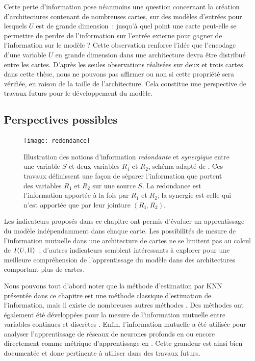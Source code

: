 \documentclass[../main]{subfiles}
\begin{document}
Cette perte d'information pose néanmoins une question concernant la création d'architectures contenant de nombreuses cartes, sur des modèles d'entrées pour lesquels $U$ est de grande dimension~: jusqu'à quel point une carte peut-elle se permettre de perdre de l'information sur l'entrée externe pour gagner de l'information sur le modèle ? 
Cette observation renforce l'idée que l'encodage d'une variable $U$ en grande dimension dans une architecture devra être distribué entre les cartes. D'après les seules observations réalisées sur deux et trois cartes dans cette thèse, nous ne pouvons pas affirmer ou non si cette propriété sera vérifiée, en raison de la taille de l'architecture.
Cela constitue une perspective de travaux futurs pour le développement du modèle.

\subsection{Perspectives possibles}

\begin{figure}
    \centering\texttt{[image: redondance]}
    \caption{Illustration des notions d'information \emph{redondante} et \emph{synergique} entre une variable $S$ et deux variables $R_1$ et $R_2$, schéma adapté de \cite{williams_nonnegative_2010}. Ces travaux définissent une façon de séparer l'information que portent des variables $R_1$ et $R_2$ sur une source $S$. La redondance est l'information apportée à la fois par $R_1$ et $R_2$; la synergie est celle qui n'est apportée que par leur jointure $(R_1,R_2)$. \label{fig:redondance}
    }
\end{figure}

Les indicateurs proposés dans ce chapitre ont permis d'évaluer un apprentissage du modèle indépendamment dans chaque carte. 
Les possibilités de mesure de l'information mutuelle dans une architecture de cartes ne se limitent pas au calcul de $I(U,\Pi)$~; d'autres indicateurs semblent intéressants à explorer pour une meilleure compréhension de l'apprentissage du modèle dans des architectures comportant plus de cartes.

Nous pouvons tout d'abord noter que la méthode d'estimation par KNN présentée dans ce chapitre est une méthode classique d'estimation de l'information, mais il existe de nombreuses autres méthodes \parencite{Doquire2012ACO}. Des méthodes ont également été développées pour la mesure de l'information mutuelle entre variables continues et discrètes \parencite{ross_mutual_2014, Gao2017EstimatingMI}. Enfin, l'information mutuelle a été utilisée pour analyser l'apprentissage de réseaux de neurones profonds en \cite{ShwartzZiv2017OpeningTB} ou encore directement comme métrique d'apprentissage en \cite{Hjelm2018LearningDR}.
Cette grandeur est ainsi bien documentée et donc pertinente à utiliser dans des travaux futurs.
\end{document}
